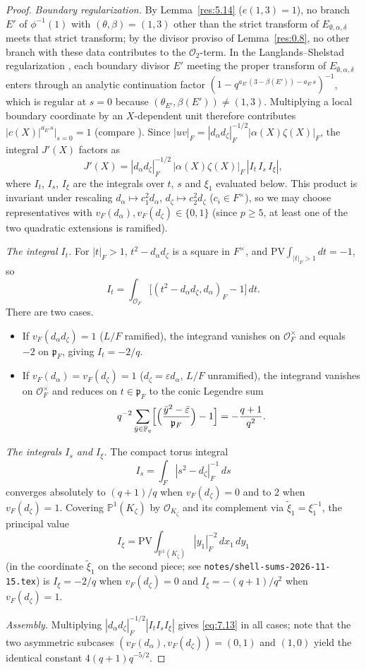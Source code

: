 \documentclass[12pt,letterpaper]{amsart}
\theoremstyle{plain}
\theoremstyle{definition}
\theoremstyle{remark}
\theoremstyle{definition}
\newcommand{\OF}{\mathcal{O}_F}
\begin{document}
\begin{proof}
\emph{Boundary regularization.}
By Lemma~\ref{res:5.14} ($e(1,3)=1$), no branch $E'$ of $\phi^{-1}(1)$
with $(\theta,\beta)=(1,3)$ other than the strict transform of
$E_{\emptyset,\alpha,\delta}$ meets that strict transform; by the divisor
proviso of Lemma~\ref{res:0.8}, no other branch with these data contributes to
the $\mathcal O_2$-term. In the Langlands--Shelstad
regularization \cite[\S\S1--2]{LS83}, each boundary divisor $E'$ meeting the
proper transform of $E_{\emptyset,\alpha,\delta}$ enters through an analytic
continuation factor $(1-q^{a_{E'}(3-\beta(E'))-a_{E'}s})^{-1}$, which is regular
at $s=0$ because $(\theta_{E'},\beta(E'))\neq(1,3)$. Multiplying a local
boundary coordinate by
an $X$-dependent unit therefore contributes $|c(X)|^{a_{E'}s}|_{s=0}=1$ (compare
\cite[Lemma~6.10, p.~243]{Ha89}). Since $|uv|_F=|d_\alpha d_\zeta|_F^{-1/2}|\alpha(X)\zeta(X)|_F$,
the integral $J'(X)$ factors as
\[
J'(X)=|d_\alpha d_\zeta|_F^{-1/2}\,|\alpha(X)\zeta(X)|_F\,|I_t\,I_s\,I_\xi|,
\]
where $I_t$, $I_s$, $I_\xi$ are the integrals over $t$, $s$ and $\xi_1$
evaluated below.
This product is invariant under rescaling $d_\alpha\mapsto c_1^2d_\alpha$,
$d_\zeta\mapsto c_2^2d_\zeta$ ($c_i\in F^\times$), so we may choose
representatives with $v_F(d_\alpha),v_F(d_\zeta)\in\{0,1\}$ (since $p\ge 5$,
at least one of the two quadratic extensions is ramified).

\emph{The integral $I_t$.} For $|t|_F>1$,
$t^2-d_\alpha d_\zeta$ is a square in $F^\times$, and
$\mathrm{PV}\int_{|t|_F>1}dt=-1$, so
\[
I_t=\int_{\OF}\bigl[(t^2-d_\alpha d_\zeta,d_\alpha)_F-1\bigr]\,dt.
\]
There are two cases.
\begin{itemize}
\item If $v_F(d_\alpha d_\zeta)=1$ ($L/F$ ramified), the integrand vanishes on
$\OF^\times$ and equals $-2$ on $\mathfrak p_F$, giving $I_t=-2/q$.
\item If $v_F(d_\alpha)=v_F(d_\zeta)=1$ ($d_\zeta=\varepsilon d_\alpha$, $L/F$
unramified), the integrand vanishes on $\OF^\times$ and reduces on
$t\in\mathfrak p_F$ to the conic Legendre sum
\[
q^{-2}\sum_{\bar y\in\mathbb F_q}\Bigl[\Bigl(\frac{\bar y^2-\bar\varepsilon}{\mathfrak p_F}\Bigr)-1\Bigr]=-\frac{q+1}{q^2}.
\]
\end{itemize}

\emph{The integrals $I_s$ and $I_\xi$.} The compact torus integral
\[
I_s=\int_F|s^2-d_\zeta|_F^{-1}\,ds
\]
converges
absolutely to $(q+1)/q$ when $v_F(d_\zeta)=0$ and to $2$ when $v_F(d_\zeta)=1$.
Covering $\mathbb{P}^1(K_\zeta)$ by $\mathcal O_{K_\zeta}$ and its complement
via $\tilde\xi_1=\xi_1^{-1}$, the principal value
\[
I_\xi=\mathrm{PV}\int_{\mathbb{P}^1(K_\zeta)}|y_1|_F^{-2}\,dx_1\,dy_1
\]
(in the coordinate $\tilde\xi_1$ on the second piece; see
\texttt{notes/shell-sums-2026-11-15.tex})
is $I_\xi=-2/q$ when $v_F(d_\zeta)=0$ and
$I_\xi=-(q+1)/q^2$ when $v_F(d_\zeta)=1$.

\emph{Assembly.} Multiplying
$|d_\alpha d_\zeta|_F^{-1/2}|I_tI_sI_\xi|$ gives \eqref{eq:7.13} in all cases;
note that the two asymmetric subcases $(v_F(d_\alpha),v_F(d_\zeta))=(0,1)$ and
$(1,0)$ yield the identical constant $4(q+1)q^{-5/2}$.
\end{proof}
\end{document}
